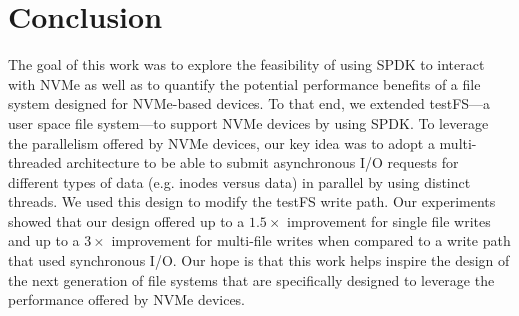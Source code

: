 \section{Conclusion}
The goal of this work was to explore the feasibility of using SPDK to interact
with NVMe as well as to quantify the potential performance benefits of a file
system designed for NVMe-based devices. To that end, we extended testFS---a
user space file system---to support NVMe devices by using SPDK. To leverage the
parallelism offered by NVMe devices, our key idea was to adopt a multi-threaded
architecture to be able to submit asynchronous I/O requests for different types
of data (e.g. inodes versus data) in parallel by using distinct threads. We
used this design to modify the testFS write path. Our experiments showed that
our design offered up to a $1.5\times$ improvement for single file writes and
up to a $3\times$ improvement for multi-file writes when compared to a write
path that used synchronous I/O. Our hope is that this work helps inspire the
design of the next generation of file systems that are specifically designed to
leverage the performance offered by NVMe devices.
